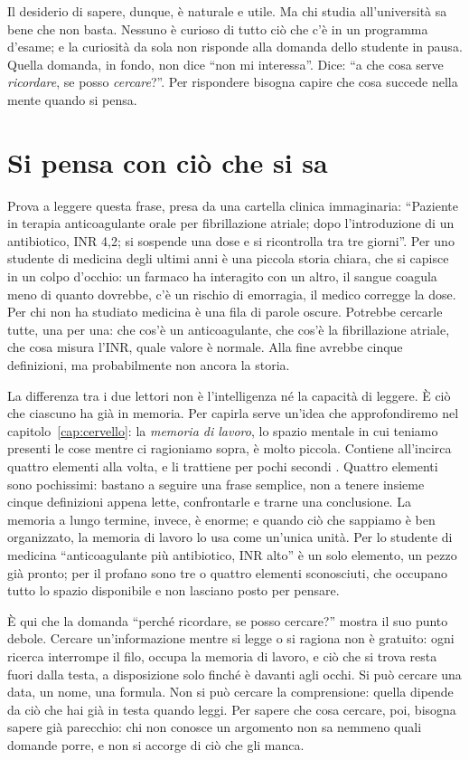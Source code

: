Il desiderio di sapere, dunque, è naturale e utile. Ma chi studia
all'università sa bene che non basta. Nessuno è curioso di tutto ciò
che c'è in un programma d'esame; e la curiosità da sola non risponde
alla domanda dello studente in pausa. Quella domanda, in fondo, non
dice \enquote{non mi interessa}. Dice: \enquote{a che cosa serve
\emph{ricordare}, se posso \emph{cercare}?}. Per rispondere bisogna
capire che cosa succede nella mente quando si pensa.

\section{Si pensa con ciò che si sa}

Prova a leggere questa frase, presa da una cartella clinica
immaginaria: \enquote{Paziente in terapia anticoagulante orale per
fibrillazione atriale; dopo l'introduzione di un antibiotico, INR
4,2; si sospende una dose e si ricontrolla tra tre giorni}. Per uno
studente di medicina degli ultimi anni è una piccola storia chiara, che
si capisce in un colpo d'occhio: un farmaco ha interagito con un altro,
il sangue coagula meno di quanto dovrebbe, c'è un rischio di
emorragia, il medico corregge la dose. Per chi non ha studiato medicina
è una fila di parole oscure. Potrebbe cercarle tutte, una per una: che
cos'è un anticoagulante, che cos'è la fibrillazione atriale, che cosa
misura l'INR, quale valore è normale. Alla fine avrebbe cinque
definizioni, ma probabilmente non ancora la storia.

La differenza tra i due lettori non è l'intelligenza né la capacità di
leggere. È ciò che ciascuno ha già in memoria. Per capirla serve
un'idea che approfondiremo nel capitolo~\ref{cap:cervello}: la
\emph{memoria di lavoro}, lo spazio mentale in cui teniamo presenti le
cose mentre ci ragioniamo sopra, è molto piccola. Contiene all'incirca
quattro elementi alla volta, e li trattiene per pochi secondi
\parencite{cowan2001}. Quattro elementi sono pochissimi: bastano a
seguire una frase semplice, non a tenere insieme cinque definizioni
appena lette, confrontarle e trarne una conclusione. La memoria a lungo
termine, invece, è enorme; e quando ciò che sappiamo è ben organizzato,
la memoria di lavoro lo usa come un'unica unità. Per lo studente di
medicina \enquote{anticoagulante più antibiotico, INR alto} è un solo
elemento, un pezzo già pronto; per il profano sono tre o quattro
elementi sconosciuti, che occupano tutto lo spazio disponibile e non
lasciano posto per pensare.

È qui che la domanda \enquote{perché ricordare, se posso cercare?}
mostra il suo punto debole. Cercare un'informazione mentre si legge o si
ragiona non è gratuito: ogni ricerca interrompe il filo, occupa la
memoria di lavoro, e ciò che si trova resta fuori dalla testa, a
disposizione solo finché è davanti agli occhi. Si può cercare una data,
un nome, una formula. Non si può cercare la comprensione: quella dipende
da ciò che hai già in testa quando leggi. Per sapere che cosa cercare,
poi, bisogna sapere già parecchio: chi non conosce un argomento non sa
nemmeno quali domande porre, e non si accorge di ciò che gli manca.


